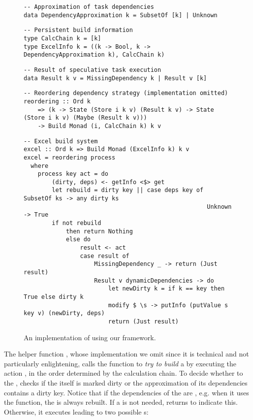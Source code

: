 \begin{figure}
\begin{verbatim}
-- Approximation of task dependencies
data DependencyApproximation k = SubsetOf [k] | Unknown
\end{verbatim}
\vspace{1mm}
\begin{verbatim}
-- Persistent build information
type CalcChain k = [k]
type ExcelInfo k = ((k -> Bool, k -> DependencyApproximation k), CalcChain k)
\end{verbatim}
\vspace{1mm}
\begin{verbatim}
-- Result of speculative task execution
data Result k v = MissingDependency k | Result v [k]
\end{verbatim}
\vspace{1mm}
\begin{verbatim}
-- Reordering dependency strategy (implementation omitted)
reordering :: Ord k
    => (k -> State (Store i k v) (Result k v) -> State (Store i k v) (Maybe (Result k v)))
    -> Build Monad (i, CalcChain k) k v
\end{verbatim}
\vspace{1mm}
\begin{verbatim}
-- Excel build system
excel :: Ord k => Build Monad (ExcelInfo k) k v
excel = reordering process
  where
    process key act = do
        (dirty, deps) <- getInfo <$> get
        let rebuild = dirty key || case deps key of SubsetOf ks -> any dirty ks
                                                    Unknown     -> True
        if not rebuild
            then return Nothing
            else do
                result <- act
                case result of
                    MissingDependency _ -> return (Just result)
                    Result v dynamicDependencies -> do
                        let newDirty k = if k == key then True else dirty k
                        modify $ \s -> putInfo (putValue s key v) (newDirty, deps)
                        return (Just result)
\end{verbatim}
\vspace{-2mm}
\caption{An implementation of \Excel using our framework.}\label{fig-excel-implementation}
\vspace{-2mm}
\end{figure}

The helper function , whose implementation we omit since it is
technical and not particularly enlightening, calls the function  to
\emph{try to build} a  by executing the action , in the order
determined by the calculation chain. To decide whether to  the
,  checks if the  itself is marked dirty or the
approximation of its dependencies contains a dirty key. Notice that if the
dependencies of the  are , e.g. when it uses the
 function, the  is always rebuilt. If a  is
not needed,  returns  to indicate this. Otherwise, it
executes  leading to two possible s:

